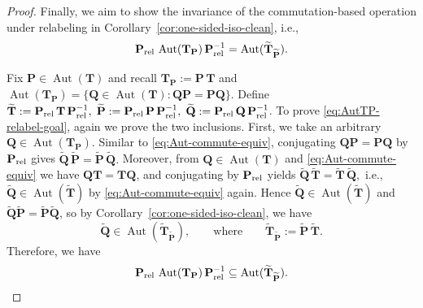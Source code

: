\documentclass[onecolumn]{IEEEtran} %
\newcommand{\bP}{\mathbf P}
\newcommand{\bQ}{\mathbf Q}
\newcommand{\1}{\mathbbm{1}}
\DeclareMathOperator{\Aut}{Aut}
\theoremstyle{boldremark}
\newcommand{\bT}{\mathbf{T}}
\begin{document}
\begin{proof}
\medskip
Finally, we aim to show the invariance of the commutation-based operation under relabeling in
Corollary~\ref{cor:one-sided-iso-clean}, i.e., 
\begin{equation}\label{eq:AutTP-relabel-goal}
\bP_{\rm rel}\,\Aut(\bT_{\bP})\,\bP_{\rm rel}^{-1}
=\Aut(\widetilde{\bT}_{\widetilde{\bP}}).
\end{equation}

Fix $\bP\in\Aut(\bT)$ and recall
$\bT_{\bP}:=\bP\,\bT$ and $\Aut(\bT_{\bP})=\{\bQ\in\Aut(\bT): \bQ\bP=\bP\bQ\}$.
Define $\widetilde{\bT}:=\bP_{\rm rel}\,\bT\,\bP_{\rm rel}^{-1},\;
\widetilde{\bP}:=\bP_{\rm rel}\,\bP\,\bP_{\rm rel}^{-1},\;
\widetilde{\bQ}:=\bP_{\rm rel}\,\bQ\,\bP_{\rm rel}^{-1}$. To prove \eqref{eq:AutTP-relabel-goal}, again we prove the two inclusions. First, we take an arbitrary $\bQ\in\Aut(\bT_{\bP})$. Similar to \eqref{eq:Aut-commute-equiv}, conjugating $\bQ\bP=\bP\bQ$ by $\bP_{\rm rel}$ gives $\widetilde{\bQ}\,\widetilde{\bP}=\widetilde{\bP}\,\widetilde{\bQ}.$
Moreover, from $\bQ\in\Aut(\bT)$ and \eqref{eq:Aut-commute-equiv} we have $\bQ\bT=\bT\bQ$,
and conjugating by $\bP_{\rm rel}$ yields $\widetilde{\bQ}\,\widetilde{\bT}=\widetilde{\bT}\,\widetilde{\bQ},$
i.e., $\widetilde{\bQ}\in\Aut(\widetilde{\bT})$ by \eqref{eq:Aut-commute-equiv} again. Hence
$\widetilde{\bQ}\in\Aut(\widetilde{\bT})$ and $\widetilde{\bQ}\widetilde{\bP}=\widetilde{\bP}\widetilde{\bQ}$, so by Corollary~\ref{cor:one-sided-iso-clean}, we have
\[
\widetilde{\bQ}\in\Aut(\widetilde{\bT}_{\widetilde{\bP}}),
\qquad\text{where}\qquad
\widetilde{\bT}_{\widetilde{\bP}}:=\widetilde{\bP}\,\widetilde{\bT}.
\]
Therefore, we have
\[
\bP_{\rm rel}\,\Aut(\bT_{\bP})\,\bP_{\rm rel}^{-1}
\subseteq
\Aut(\widetilde{\bT}_{\widetilde{\bP}}).
\]


\end{proof}
\end{document}
